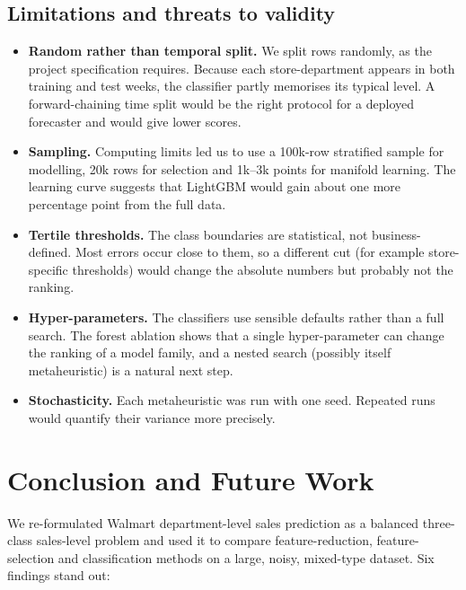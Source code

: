 \subsection{Limitations and threats to validity}
\begin{itemize}
\item \textbf{Random rather than temporal split.} We split rows randomly, as the project specification requires. Because each store-department appears in both training and test weeks, the classifier partly memorises its typical level. A forward-chaining time split would be the right protocol for a deployed forecaster and would give lower scores.
\item \textbf{Sampling.} Computing limits led us to use a 100k-row stratified sample for modelling, 20k rows for selection and 1k--3k points for manifold learning. The learning curve suggests that LightGBM would gain about one more percentage point from the full data.
\item \textbf{Tertile thresholds.} The class boundaries are statistical, not business-defined. Most errors occur close to them, so a different cut (for example store-specific thresholds) would change the absolute numbers but probably not the ranking.
\item \textbf{Hyper-parameters.} The classifiers use sensible defaults rather than a full search. The forest ablation shows that a single hyper-parameter can change the ranking of a model family, and a nested search (possibly itself metaheuristic) is a natural next step.
\item \textbf{Stochasticity.} Each metaheuristic was run with one seed. Repeated runs would quantify their variance more precisely.
\end{itemize}

\section{Conclusion and Future Work}\label{sec:conclusion}
We re-formulated Walmart department-level sales prediction as a balanced three-class sales-level problem and used it to compare feature-reduction, feature-selection and classification methods on a large, noisy, mixed-type dataset. Six findings stand out:

